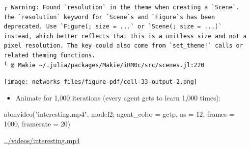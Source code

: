 \documentclass[
  letterpaper,
  DIV=11,
  numbers=noendperiod]{scrartcl}
\newenvironment{Shaded}{\begin{snugshade}}{\end{snugshade}}
\newcommand{\FloatTok}[1]{\textcolor[rgb]{0.68,0.00,0.00}{#1}}
\newcommand{\FunctionTok}[1]{\textcolor[rgb]{0.28,0.35,0.67}{#1}}
\newcommand{\NormalTok}[1]{\textcolor[rgb]{0.00,0.23,0.31}{#1}}
\newcommand{\OperatorTok}[1]{\textcolor[rgb]{0.37,0.37,0.37}{#1}}
\newcommand{\StringTok}[1]{\textcolor[rgb]{0.13,0.47,0.30}{#1}}
\providecommand{\tightlist}{%
  \setlength{\itemsep}{0pt}\setlength{\parskip}{0pt}}\usepackage{longtable,booktabs,array}
\begin{document}
\begin{verbatim}
┌ Warning: Found `resolution` in the theme when creating a `Scene`. The `resolution` keyword for `Scene`s and `Figure`s has been deprecated. Use `Figure(; size = ...` or `Scene(; size = ...)` instead, which better reflects that this is a unitless size and not a pixel resolution. The key could also come from `set_theme!` calls or related theming functions.
└ @ Makie ~/.julia/packages/Makie/iRM0c/src/scenes.jl:220
\end{verbatim}

\texttt{[image: networks\_files/figure-pdf/cell-33-output-2.png]}

\begin{itemize}
\tightlist
\item
  Animate for 1,000 iterations (every agent gets to learn 1,000 times):
\end{itemize}

\begin{Shaded}
\begin{Highlighting}[]
\FunctionTok{abmvideo}\NormalTok{(}\StringTok{"interesting.mp4"}\NormalTok{, model2; agent\_color }\OperatorTok{=}\NormalTok{ getp,}
\NormalTok{         as }\OperatorTok{=} \FloatTok{12}\NormalTok{, frames }\OperatorTok{=} \FloatTok{1000}\NormalTok{, framerate }\OperatorTok{=} \FloatTok{20}\NormalTok{)}
\end{Highlighting}
\end{Shaded}

\url{../videos/interesting.mp4}
\end{document}
